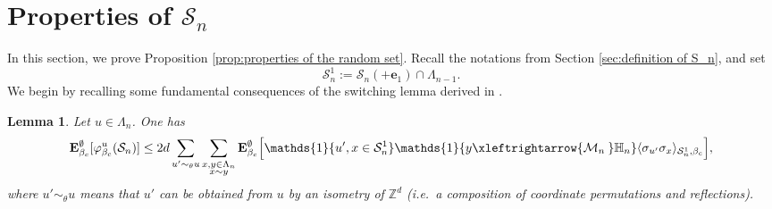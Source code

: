 \documentclass[11pt,a4paper]{article}
\numberwithin{equation}{section}
\theoremstyle{plain}
\newtheorem{Lem}[Thm]{Lemma}
\theoremstyle{definition}
\newcommand{\connect}{\xleftrightarrow}
\begin{document}
\section{Properties of $\mathcal S_n$}\label{sec: properties of random set}
In this section, we prove Proposition \ref{prop:properties of the random set}. Recall the notations from Section \ref{sec:definition of S_n}, and set
\begin{equation} 
\mathcal S_n^1:=\mathcal S_n(+\mathbf{e}_1)\cap \Lambda_{n-1}.
\end{equation}
 We begin by recalling some fundamental consequences of the switching lemma derived in \cite{DuminilPanis2024newLB}. 
\begin{Lem}\label{lem:random phi moved} Let $u\in \Lambda_n$. One has
\begin{equation}
	\mathbf E_{\beta_c}^\emptyset[\varphi_{\beta_c}^u(\mathcal S_n)]\leq 2d\sum_{u'\sim_{\theta}u}\sum_{\substack{x,y\in \Lambda_n\\x\sim y}}\mathbf E_{\beta_c}^\emptyset\Big[\mathds{1}\{u',x\in \mathcal S_n^1\}\mathds{1}\{y\connect{\mathcal M_n\:}\mathbb H_n\}\langle \sigma_{u'}\sigma_x\rangle_{\mathcal S_n^1,\beta_c}\Big],
\end{equation}
where $u'\sim_\theta u$ means that $u'$ can be obtained from $u$ by an 
isometry of $\mathbb{Z}^d$ (i.e.\ a composition of coordinate permutations 
and reflections).\end{Lem}
\end{document}
